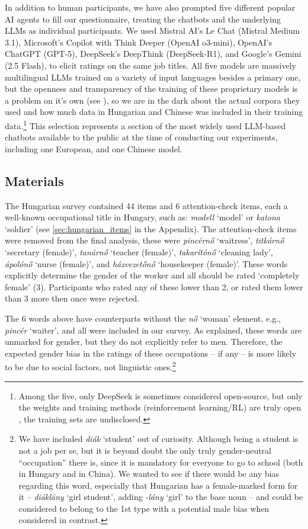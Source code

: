 \documentclass[runningheads]{llncs}
\renewcommand\cite{\citep}    %
\begin{document}
In addition to human participants, we have also prompted five different popular AI agents to fill our questionnaire, treating the chatbots and the underlying LLMs as individual participants. We used Mistral AI's Le Chat (Mistral Medium 3.1), Microsoft's Copilot with Think Deeper (OpenAI o3-mini), OpenAI's ChatGPT (GPT-5), DeepSeek's DeepThink (DeepSeek-R1), and Google's Gemini (2.5 Flash), to elicit ratings on the same job titles. All five models are massively multilingual LLMs trained on a variety of input languages besides a primary one, but the openness and transparency of the training of these proprietary models is a problem on it's own (see \cite{liesenfeld_2023_opening}), so we are in the dark about the actual corpora they used and how much data in Hungarian and Chinese was included in their training data.\footnote{Among the five, only DeepSeek is sometimes considered open-source, but only the weights and training methods (reinforcement learning/RL) are truly open \cite{deepseekai_2025_deepseekr1}, the training sets are undisclosed.} This selection represents a section of the most widely used LLM-based chatbots available to the public at the time of conducting our experiments, including one European, and one Chinese model.

\subsection{Materials}

The Hungarian survey contained 44 items and 6 attention-check items, each a well-known occupational title in Hungary, such as: \textit{modell} `model' or \textit{katona} `soldier' (see \ref{sec:hungarian_items} in the Appendix). The attention-check items were removed from the final analysis, these were \textit{pincérnő} `waitress', \textit{titkárnő} `secretary (female)', \textit{tanárnő} `teacher (female)', \textit{takarítónő} `cleaning lady', \textit{ápolónő} `nurse (female)', and \textit{házvezetőnő} `housekeeper (female)'. These words explicitly determine the gender of the worker and all should be rated `completely female' (3). Participants who rated any of these lower than 2, or rated them lower than 3 more then once were rejected.

The 6 words above have counterparts without the \textit{nő} `woman' element, e.g., \textit{pincér} `waiter', and all were included in our survey. As explained, these words are unmarked for gender, but they do not explicitly refer to men. Therefore, the expected gender bias in the ratings of these occupations -- if any -- is more likely to be due to social factors, not linguistic ones.\footnote{We have included \textit{diák} `student' out of curiosity. Although being a student is not a job per se, but it is beyond doubt the only truly gender-neutral ``occupation'' there is, since it is mandatory for everyone to go to school (both in Hungary and in China). We wanted to see if there would be any bias regarding this word, especially that Hungarian has a female-marked form for it -- \textit{diáklány} `girl student', adding \textit{-lány} `girl' to the base noun -- and could be considered to belong to the 1st type with a potential male bias when considered in contrast.}
\end{document}
